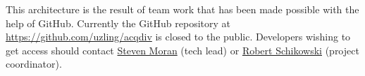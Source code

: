 \documentclass[a4paper, 11pt]{book}
\begin{document}
This architecture is the result of team work that has been made possible with the help of GitHub. Currently the GitHub repository at \url{https://github.com/uzling/acqdiv} is closed to the public. Developers wishing to get access should contact \href{mailto:steven.moran@uzh.ch}{Steven Moran} (tech lead) or \href{mailto:robert.schikowski@uzh.ch}{Robert Schikowski} (project coordinator). 

%


\newpage
 

\end{document}
